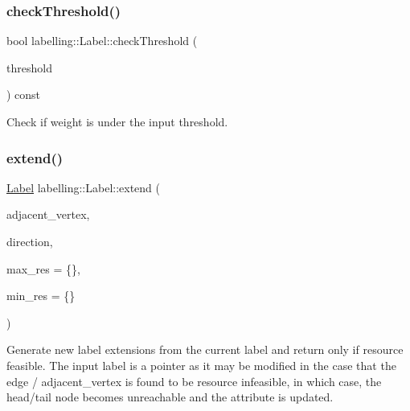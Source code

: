 \subsubsection{\texorpdfstring{check\+Threshold()}{checkThreshold()}}
{\footnotesize\ttfamily bool labelling\+::\+Label\+::check\+Threshold (\begin{DoxyParamCaption}\item[{const double \&}]{threshold }\end{DoxyParamCaption}) const}



Check if weight is under the input threshold. 

\mbox{\label{classlabelling_1_1Label_a23f7e5da2fb22dca07977aad9bfa9ad3}} 
\subsubsection{\texorpdfstring{extend()}{extend()}}
{\footnotesize\ttfamily \hyperlink{classlabelling_1_1Label}{Label} labelling\+::\+Label\+::extend (\begin{DoxyParamCaption}\item[{const \hyperlink{structbidirectional_1_1AdjVertex}{bidirectional\+::\+Adj\+Vertex} \&}]{adjacent\+\_\+vertex,  }\item[{const \hyperlink{namespacebidirectional_a4cbe6f0bfbd3629c2cd44c98014aed70}{bidirectional\+::\+Directions} \&}]{direction,  }\item[{const std\+::vector$<$ double $>$ \&}]{max\+\_\+res = {\ttfamily \{\}},  }\item[{const std\+::vector$<$ double $>$ \&}]{min\+\_\+res = {\ttfamily \{\}} }\end{DoxyParamCaption})}

Generate new label extensions from the current label and return only if resource feasible. The input label is a pointer as it may be modified in the case that the edge / adjacent\+\_\+vertex is found to be resource infeasible, in which case, the head/tail node becomes unreachable and the attribute is updated.



